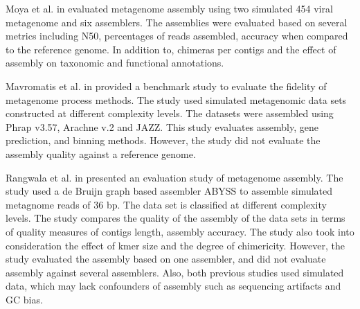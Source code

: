 \documentclass[11pt]{article}
\begin{document}

 

 
Moya et al. in \cite{moya2014} evaluated metagenome assembly using
two simulated 454 viral metagenome and six assemblers. The assemblies
were evaluated based on several metrics including N50, percentages of
reads assembled, accuracy when compared to the reference genome. In
addition to, chimeras per contigs and the effect of assembly on
taxonomic and functional annotations.
 
Mavromatis et al. in \cite{mavromatis2007} provided a benchmark study
to evaluate the fidelity of metagenome process methods. The study used
simulated metagenomic data sets constructed at different complexity
levels.
The datasets were assembled using Phrap v3.57, Arachne v.2
\cite{arachne} and JAZZ. \cite{jazz}
This study evaluates assembly, gene prediction, and binning
methods. However, the study did not evaluate the assembly quality
against a reference genome.

Rangwala et al. in \cite{huzefa2011} presented an evaluation study of
metagenome assembly. The study used a de Bruijn graph based assembler
ABYSS \cite{abyss} to assemble simulated metagnome reads of 36 bp. The
data set is classified at different complexity levels.
The study compares the quality of the assembly of the data sets in
terms of quality measures of contigs length, assembly accuracy. The
study also took into consideration the effect of kmer size and the
degree of chimericity.  However, the study evaluated the assembly
based on one assembler, and did not evaluate assembly against several
assemblers.  Also, both previous studies used simulated data, which
may lack confounders of assembly such as sequencing artifacts and GC bias.
\end{document}
